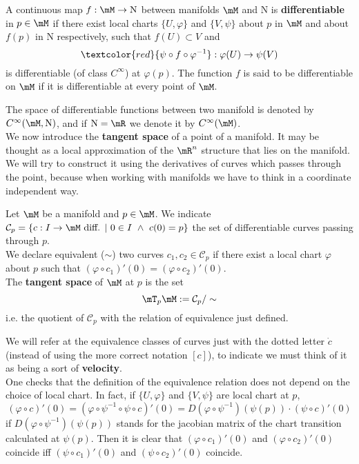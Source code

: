 \begin{definition}
	A continuous map $f:\mM\to\mathrm{N}$ between manifolds $\mM$ and $\mathrm{N}$ is \textbf{differentiable} in $p\in\mM$ if there exist local charts $\{U,\varphi\}$ and $\{V,\psi\}$ about $p$ in $\mM$ and about $f(p)$ in $\mathrm{N}$ respectively, such that $f(U)\subset V$ and
	$$ \textcolor{red}{\psi\circ f\circ \varphi^{-1}}:\varphi(U)\to\psi(V)$$
	is differentiable (of class $C^\infty$) at $\varphi(p)$. The function $f$ is said to be differentiable on $\mM$ if it is differentiable at every point of $\mM$.
\end{definition}

The space of differentiable functions between two manifold is denoted by $C^\infty(\mM,\mathrm{N})$, and if $\mathrm{N}=\mR$ we denote it by $C^\infty(\mM)$.\\

We now introduce the \textbf{tangent space} of a point of a manifold. It may be thought as a local approximation of the $\mR^n$ structure that lies on the manifold. We will try to construct it using the derivatives of curves which passes through the point, because when working with
manifolds we have to think in a coordinate independent way.

\begin{definition}
	Let $\mM$ be a manifold and $p\in\mM$. We indicate $\mathcal{C}_p=\{c:I\to\mM\ \text{diff. }|\ 0\in I\ \wedge\ c(0)=p\}$ the set of differentiable curves passing through $p$.\\
	We declare equivalent ($\sim$) two curves $c_1,c_2\in\mathcal{C}_p$ if there exist a local chart $\varphi$ about $p$ such that $(\varphi\circ c_1)'(0)=(\varphi\circ c_2)'(0)$.\\
	The \textbf{tangent space} of $\mM$ at $p$ is the set
	$$\mT_p\mM:=\mathcal{C}_p/\sim$$
	i.e. the quotient of $\mathcal{C}_p$ with the relation of equivalence just defined.
\end{definition}
We will refer at the equivalence classes of curves just with the dotted letter $\dot{c}$ (instead of using the more correct notation $[c]$), to indicate we must think of it as being a sort of \textbf{velocity}.\\

One checks that the definition of the equivalence relation does not depend on the choice of local chart. In fact, if $\{U,\varphi\}$ and $\{V,\psi\}$ are local chart at $p$,
\[ (\varphi\circ c)'(0)=(\varphi\circ\psi^{-1}\circ\psi\circ c)'(0)=D(\varphi\circ\psi^{-1})(\psi(p))\cdot(\psi\circ c)'(0)\]
if $D(\varphi\circ\psi^{-1})(\psi(p))$ stands for the jacobian matrix of the chart transition calculated at $\psi(p)$. Then it is clear that $(\varphi\circ c_1)'(0)$ and $(\varphi\circ c_2)'(0)$ coincide iff $(\psi\circ c_1)'(0)$ and $(\psi\circ c_2)'(0)$ coincide.\\

